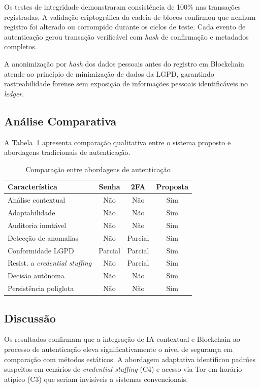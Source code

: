 \documentclass[12pt]{article}
\begin{document}
Os testes de integridade demonstraram consistência de 100\% nas transações registradas. A validação criptográfica da cadeia de blocos confirmou que nenhum registro foi alterado ou corrompido durante os ciclos de teste. Cada evento de autenticação gerou transação verificável com \textit{hash} de confirmação e metadados completos.

A anonimização por \textit{hash} dos dados pessoais antes do registro em Blockchain atende ao princípio de minimização de dados da LGPD, garantindo rastreabilidade forense sem exposição de informações pessoais identificáveis no \textit{ledger}.

\subsection{Análise Comparativa}

A Tabela~\ref{tab:comparison} apresenta comparação qualitativa entre o sistema proposto e abordagens tradicionais de autenticação.

\begin{table}[H]
\centering
\caption{Comparação entre abordagens de autenticação}
\label{tab:comparison}
\small
\begin{tabular}{@{}lccc@{}}
\toprule
\textbf{Característica} & \textbf{Senha} & \textbf{2FA} & \textbf{Proposta} \\
\midrule
Análise contextual           & Não     & Não     & Sim \\
Adaptabilidade               & Não     & Não     & Sim \\
Auditoria imutável           & Não     & Não     & Sim \\
Detecção de anomalias        & Não     & Parcial & Sim \\
Conformidade LGPD            & Parcial & Parcial & Sim \\
Resist. a \textit{credential stuffing} & Não & Parcial & Sim \\
Decisão autônoma             & Não     & Não     & Sim \\
Persistência poliglota       & Não     & Não     & Sim \\
\bottomrule
\end{tabular}
\end{table}

\subsection{Discussão}

Os resultados confirmam que a integração de IA contextual e Blockchain ao processo de autenticação eleva significativamente o nível de segurança em comparação com métodos estáticos. A abordagem adaptativa identificou padrões suspeitos em cenários de \textit{credential stuffing} (C4) e acesso via Tor em horário atípico (C3) que seriam invisíveis a sistemas convencionais.
\end{document}
